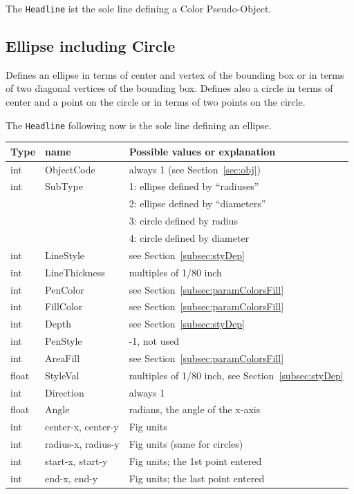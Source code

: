 \documentclass[10pt, a4paper, english]{article}%
\begin{document}
The \texttt{Headline} ist the sole line defining a Color Pseudo-Object. 


\subsection{Ellipse including Circle}\label{subsec:ellipse}

Defines an ellipse in terms of center and vertex of the bounding box 
or in terms of two diagonal vertices of the bounding box. 
Defines also a circle in terms of center and a point on the circle 
or in terms of two points on the circle. 

\noindent
The \texttt{Headline} following now is the sole line defining an ellipse. \\
%
\begin{tabular}{lll}
\toprule
Type  & name                & Possible values or explanation \\
\midrule
\midrule
int   &  ObjectCode         & always 1 (see Section~\ref{sec:obj}) \\
int   &  SubType            & 1: ellipse defined by ``radiuses'' \\
&&                            2: ellipse defined by ``diameters'' \\
&&                            3: circle defined by radius \\
&&                            4: circle defined by diameter \\
int   &  LineStyle          & see Section~\ref{subsec:styDep} \\
int   &  LineThickness      & multiples of 1/80 inch \\
int   &  PenColor           & see Section~\ref{subsec:paramColorsFill} \\
int   &  FillColor          & see Section~\ref{subsec:paramColorsFill} \\
int   &  Depth              & see Section~\ref{subsec:styDep} \\
int   &  PenStyle           & -1, not used \\
int   &  AreaFill           & see Section~\ref{subsec:paramColorsFill} \\
float &  StyleVal           & multiples of 1/80 inch, 
                              see Section~\ref{subsec:styDep}  \\
int   &  Direction          & always 1 \\
float &  Angle              & radians, the angle of the x-axis \\
int   &  center-x, center-y & Fig units \\
int   &  radius-x, radius-y & Fig units (same for circles) \\
int   &  start-x, start-y   & Fig units; the 1st point entered \\
int   &  end-x, end-y       & Fig units; the last point entered \\
\bottomrule
\end{tabular}
\end{document}
